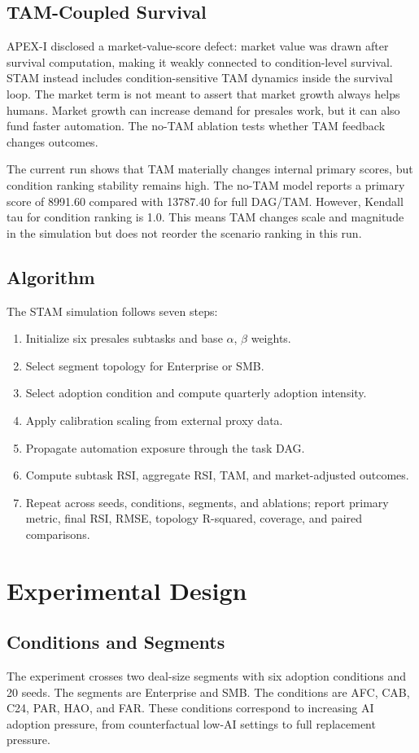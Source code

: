 \documentclass[10pt,conference]{IEEEtran}
\begin{document}
\subsection{TAM-Coupled Survival}
APEX-I disclosed a market-value-score defect: market value was drawn after survival computation, making it weakly connected to condition-level survival. STAM instead includes condition-sensitive TAM dynamics inside the survival loop. The market term is not meant to assert that market growth always helps humans. Market growth can increase demand for presales work, but it can also fund faster automation. The no-TAM ablation tests whether TAM feedback changes outcomes.

The current run shows that TAM materially changes internal primary scores, but condition ranking stability remains high. The no-TAM model reports a primary score of 8991.60 compared with 13787.40 for full DAG/TAM. However, Kendall tau for condition ranking is 1.0. This means TAM changes scale and magnitude in the simulation but does not reorder the scenario ranking in this run.

\subsection{Algorithm}
The STAM simulation follows seven steps:
\begin{enumerate}
\item Initialize six presales subtasks and base $\alpha$, $\beta$ weights.
\item Select segment topology for Enterprise or SMB.
\item Select adoption condition and compute quarterly adoption intensity.
\item Apply calibration scaling from external proxy data.
\item Propagate automation exposure through the task DAG.
\item Compute subtask RSI, aggregate RSI, TAM, and market-adjusted outcomes.
\item Repeat across seeds, conditions, segments, and ablations; report primary metric, final RSI, RMSE, topology R-squared, coverage, and paired comparisons.
\end{enumerate}

\section{Experimental Design}
\subsection{Conditions and Segments}
The experiment crosses two deal-size segments with six adoption conditions and 20 seeds. The segments are Enterprise and SMB. The conditions are AFC, CAB, C24, PAR, HAO, and FAR. These conditions correspond to increasing AI adoption pressure, from counterfactual low-AI settings to full replacement pressure.
\end{document}
